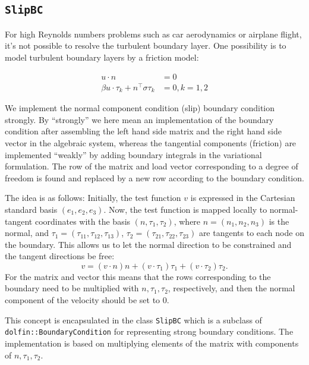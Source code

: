 \subsection{\tt SlipBC}

For high Reynolds numbers problems such as car aerodynamics or
airplane flight, it's not possible to resolve the turbulent boundary
layer. One possibility is to model turbulent boundary layers by a
friction model:

\begin{align}
u \cdot n &= 0\\
\beta u \cdot \tau_k + n^\top \sigma \tau_k &= 0, k = 1, 2
\end{align}

We implement the normal component condition (slip) boundary condition
strongly. By ``strongly'' we here mean an implementation of the
boundary condition after assembling the left hand side matrix and the
right hand side vector in the algebraic system, whereas the tangential
components (friction) are implemented ``weakly'' by adding boundary
integrals in the variational formulation.  The row of the matrix and
load vector corresponding to a degree of freedom is found and replaced
by a new row according to the boundary condition.

The idea is as follows: Initially, the test function $v$ is expressed
in the Cartesian standard basis $(e_1, e_2, e_3)$.  Now, the test
function is mapped locally to normal-tangent coordinates with the
basis $(n, \tau_1, \tau_2)$, where $n = (n_1, n_2, n_3)$ is the
normal, and $\tau_1 = (\tau_{11}, \tau_{12}, \tau_{13})$, $\tau_2 =
(\tau_{21}, \tau_{22}, \tau_{23})$ are tangents to each node on the
boundary. This allows us to let the normal direction to be constrained
and the tangent directions be free:
\begin{equation}
     v = (v \cdot n)n + (v \cdot \tau_1) \tau_1 + (v \cdot \tau_2) \tau_2.
\end{equation}
For the matrix and vector this means that the rows corresponding to
the boundary need to be multiplied with $n,\tau_1,\tau_2$,
respectively, and then the normal component of the velocity should be
set to 0.

This concept is encapsulated in the class {\tt SlipBC} which is a
subclass of \\ {\tt dolfin::BoundaryCondition} for representing strong
boundary conditions. The implementation is based on multiplying
elements of the matrix with components of $n,\tau_1,\tau_2$.

